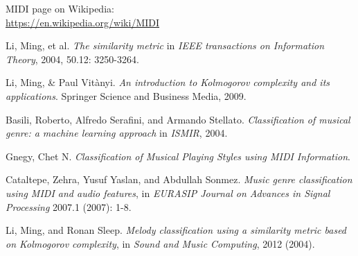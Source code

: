 \documentclass[a4paper]{article}
\begin{document}
	\clearpage
	\begin{thebibliography}{1}
		 MIDI page on Wikipedia:\\
		\href{https://en.wikipedia.org/wiki/MIDI}{https://en.wikipedia.org/wiki/MIDI}
		
		 Li, Ming, et al. {\em The similarity metric} in \textit{IEEE transactions on Information Theory}, 2004, 50.12: 3250-3264.
		
		 Li, Ming, \& Paul Vit\`{a}nyi. {\em An introduction to Kolmogorov complexity and its applications}. Springer Science and Business Media, 2009.
		
		 Basili, Roberto, Alfredo Serafini, and Armando Stellato. {\em Classification of musical genre: a machine learning approach} in \textit{ISMIR}, 2004.
		
		 Gnegy, Chet N. {\em Classification of Musical Playing Styles using MIDI Information}.
		
		 Cataltepe, Zehra, Yusuf Yaslan, and Abdullah Sonmez. {\em Music genre classification using MIDI and audio features}, in \textit{EURASIP Journal on Advances in Signal Processing} 2007.1 (2007): 1-8.
		
		 Li, Ming, and Ronan Sleep. {\em Melody classification using a similarity metric based on Kolmogorov complexity}, in \textit{Sound and Music Computing}, 2012 (2004).
	\end{thebibliography}
\end{document}
